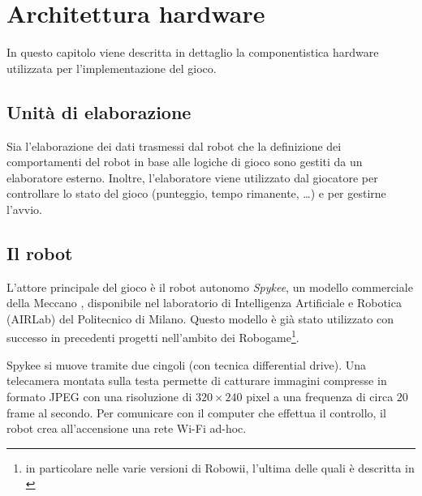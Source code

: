 \chapter{Architettura hardware}
\label{cap:architettura}

In questo capitolo viene descritta in dettaglio la componentistica hardware utilizzata per l'implementazione del gioco.

\section{Unità di elaborazione}
Sia l'elaborazione dei dati trasmessi dal robot che la definizione dei comportamenti del robot in base alle logiche di gioco sono gestiti da un elaboratore esterno. Inoltre, l'elaboratore viene utilizzato dal giocatore per controllare lo stato del gioco (punteggio, tempo rimanente, \dots) e per gestirne l'avvio.

\section{Il robot}


L'attore principale del gioco è il robot autonomo \emph{Spykee}, un modello commerciale della Meccano \cite{spykeeweb}, disponibile nel laboratorio di Intelligenza Artificiale e Robotica (AIRLab) del Politecnico di Milano. Questo modello è già stato utilizzato con successo in precedenti progetti nell'ambito dei Robogame\footnote{in particolare nelle varie versioni di Robowii, l'ultima delle quali è descritta in \cite{robowii}}.

Spykee si muove tramite due cingoli (con tecnica differential drive). Una telecamera montata sulla testa permette di catturare immagini compresse in formato JPEG con una risoluzione di $320 \times 240$ pixel a una frequenza di circa $20$ frame al secondo. Per comunicare con il computer che effettua il controllo, il robot crea all'accensione una rete Wi-Fi ad-hoc.

